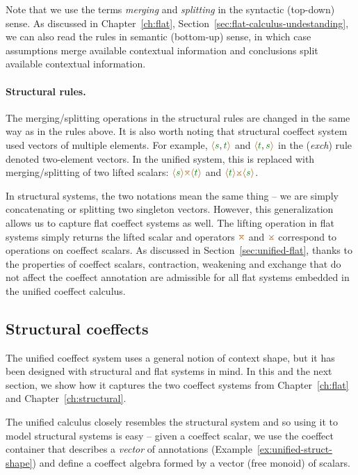 Note that we use the terms \emph{merging} and \emph{splitting} in the syntactic (top-down) sense. As 
discussed in Chapter~\ref{ch:flat}, Section~\ref{sec:flat-calculus-undestanding}, we can also read 
the rules in semantic (bottom-up) sense, in which case assumptions merge available contextual 
information and conclusions split available contextual information.

\paragraph{Structural rules.}
The merging/splitting operations in the structural rules are changed in the same way as in the
rules above. It is also worth noting that structural coeffect system used vectors of multiple 
elements. For example, $\alift{\cclrd{s},\cclrd{t}}$ and $\alift{\cclrd{t},\cclrd{s}}$ in the (\emph{exch}) 
rule denoted two-element vectors. In the unified system, this is replaced with merging/splitting
of two lifted scalars: $\alift{\cclrd{s}} \azip \alift{\cclrd{t}}$ and $\alift{\cclrd{t}} \apar \alift{\cclrd{s}}$.

In structural systems, the two notations mean the same thing -- we are simply concatenating or splitting two 
singleton vectors. However, this generalization allows us to capture flat coeffect systems as well.
The lifting operation in flat systems simply returns the lifted scalar and operators $\azip$ and
$\apar$ correspond to operations on coeffect scalars. As discussed in Section~\ref{sec:unified-flat},
thanks to the properties of coeffect scalars, contraction, weakening and exchange that do not 
affect the coeffect annotation are admissible for all flat systems embedded in the unified 
coeffect calculus.


\subsection{Structural coeffects}
\label{sec:unified-structural}

The unified coeffect system uses a general notion of context shape, but it has been designed with 
structural and flat systems in mind. In this and the next section, we show how it captures 
the two coeffect systems from Chapter~\ref{ch:flat} and Chapter~\ref{ch:structural}. 

The unified calculus closely resembles the structural system and so using it to model structural
systems is easy -- given a coeffect scalar, we use the coeffect container that describes a \emph{vector} 
of annotations (Example~\ref{ex:unified-struct-shape}) and define a coeffect algebra formed by
a vector (free monoid) of scalars.

